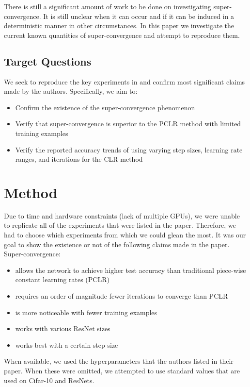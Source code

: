 \documentclass[10pt,twocolumn,letterpaper]{article}
\begin{document}
There is still a significant amount of work to be done on investigating
super-convergence. It is still unclear when it can occur and if it can be
induced in a deterministic manner in other circumstances. In this paper we
investigate the current known quantities of super-convergence and attempt to
reproduce them.

\subsection{Target Questions}
We seek to reproduce the key experiments in \cite{SuperConvergence} and confirm
most significant claims made by the authors. Specifically, we aim to:
\begin{itemize}
    \item Confirm the existence of the super-convergence phenomenon
    \item Verify that super-convergence is superior to the PCLR method with
        limited training examples
    \item Verify the reported accuracy trends of using varying step sizes,
        learning rate ranges, and iterations for the CLR method
\end{itemize}

\section{Method}
\label{sec:method}
Due to time and hardware constraints (lack of multiple GPUs), we were unable to
replicate all of the experiments that were listed in the paper. Therefore, we
had to choose which experiments from which we could glean the most. It was our
goal to show the existence or not of the following claims made in the paper.
Super-convergence:
\begin{itemize}
    \item allows the network to achieve higher test accuracy than traditional
        piece-wise constant learning rates (PCLR)
    \item requires an order of magnitude fewer iterations to converge than PCLR
    \item is more noticeable with fewer training examples
    \item works with various ResNet sizes
    \item works best with a certain step size
\end{itemize}

When available, we used the hyperparameters that the authors listed in their
paper. When these were omitted, we attempted to use standard values that are
used on Cifar-10 and ResNets.
\end{document}
